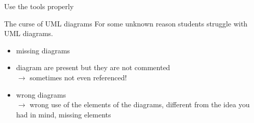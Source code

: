 \documentclass[presentation]{beamer}\mode<presentation>{\usetheme{AMSBolognaFC}}
\begin{document}
\begin{frame}[c,allowframebreaks]{Use the tools properly}
    
    
    \begin{block}{The curse of UML diagrams}
        For some unknown reason students struggle with UML diagrams.
        \begin{itemize}
            \item missing diagrams
            \item diagram are present but they are not commented
            \\
            $\rightarrow$ \alert{sometimes not even referenced!}
            \item wrong diagrams
            \\
            $\rightarrow$ wrong use of the elements of the diagrams, different from the idea you had in mind, missing elements
        \end{itemize}
    \end{block}
    
    \framebreak
    

\end{frame}
\end{document}
